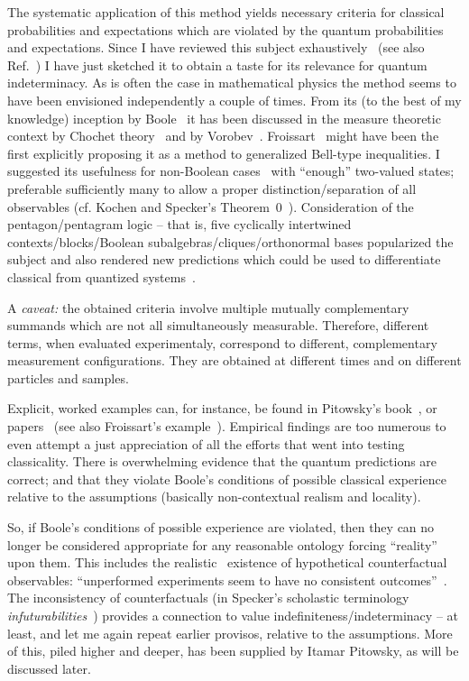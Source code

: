 \documentclass[%
  twocolumn,
 showpacs,
 showkeys,
 preprintnumbers,
 amsmath,amssymb,
 aps,
  pra,
  longbibliography,
 ]{revtex4-1}
\begin{document}
The systematic application of this method yields necessary criteria for classical probabilities and expectations
which are violated by the quantum probabilities and expectations.
Since I have reviewed this subject exhaustively~\cite[Sect.~12.9]{svozil-2016-pu-book} (see also Ref.~\citep{svozil-2017-b})
I have just sketched it to obtain a taste for its relevance for quantum indeterminacy.
As is often the case in mathematical physics
the method seems to have been envisioned independently a couple of times.
From its (to the best of my knowledge) inception by Boole~\citep{Boole-62}
it has been discussed in the measure theoretic context by Chochet theory~\citep{Bishop-Leeuw-1959}
and by Vorobev~\citep{Vorobev-1962}.
Froissart~\citep{froissart-81,cirelson} might have been the first explicitly proposing it as a method to generalized Bell-type inequalities.
I suggested its usefulness for non-Boolean cases~\citep{svozil-2001-cesena} with ``enough'' two-valued states; preferable sufficiently many to
allow a proper distinction/separation of all observables (cf. Kochen and Specker's Theorem~0~\cite[p.~67]{kochen1}).
Consideration of the pentagon/pentagram logic -- that is, five cyclically intertwined contexts/blocks/Boolean subalgebras/cliques/orthonormal bases
popularized the subject and also rendered new predictions which could be used to differentiate
classical from quantized systems~\citep{Klyachko-2002,Klyachko-2008,Bub-2009,Bub-2010,Badziag-2011}.

A {\it caveat:}
the  obtained criteria involve multiple mutually complementary summands which are not all simultaneously measurable.
Therefore, different terms,
when evaluated experimentaly,
correspond to different, complementary measurement configurations.
They are obtained at different times and on different particles and samples.

Explicit, worked examples can, for instance, be found in Pitowsky's book~\cite[Section~2.1]{pitowsky},
or papers~\citep{Pit-94} (see also Froissart's example~\citep{froissart-81}).
Empirical findings are too numerous to even attempt a just appreciation of all the efforts that went into
testing classicality. There is overwhelming evidence that the quantum predictions are correct;
and that they violate Boole's
conditions of possible classical experience~\citep{clauser-talkvie} relative to the assumptions (basically non-contextual realism and locality).


So, if Boole's conditions of possible experience are violated, then
they can no longer be considered appropriate for any reasonable ontology forcing ``reality'' upon them.
This includes the realistic~\citep{stace} existence of hypothetical counterfactual observables: ``unperformed experiments seem to have no
consistent outcomes''~\citep{peres222}.
The inconsistency of counterfactuals (in Specker's scholastic terminology {\it infuturabilities}~\citep{specker-60,specker-ep})
provides a connection to value indefiniteness/indeterminacy -- at least, and let me again repeat earlier provisos, relative to the assumptions.
More of this, piled higher and deeper, has been supplied
by Itamar Pitowsky, as will be discussed later.
\end{document}
